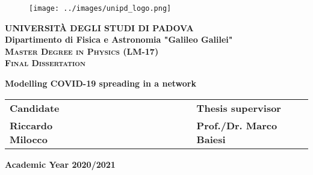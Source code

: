 \documentclass[a4paper,11pt,twoside]{report} %
\makeatletter
\renewcommand\tableofcontents{%
    \section*{\Huge{\contentsname}}%
    \@starttoc{toc}%
}
\makeatother
\begin{document}

\begin{titlepage}
\vspace{5mm}
\begin{figure}[hbtp]
\centering
\texttt{[image: ../images/unipd\_logo.png]}
\end{figure}
\vspace{5mm}
\begin{center}
{{\huge{\textsc{\bf UNIVERSIT\`A DEGLI STUDI DI PADOVA}}}\\}
\vspace{5mm}
{\Large{\bf Dipartimento di Fisica e Astronomia "Galileo Galilei"}} \\
\vspace{5mm}
{\Large{\textsc{\bf Master Degree in Physics (LM-17)}}}\\
\vspace{20mm}
{\Large{\textsc{\bf Final Dissertation}}}\\
\vspace{30mm}
\begin{spacing}{3}
{\LARGE \textbf{Modelling COVID-19 spreading in a network}}\\
\end{spacing}
\vspace{8mm}
\end{center}

\vspace{20mm}
\begin{spacing}{2}
\begin{tabular}{ l  c  c c c  cc c c c c  l }
{\Large{\bf Candidate}} &&&&&&&&&&& {\Large{\bf Thesis supervisor}}\\
{\Large{\bf Riccardo Milocco}} &&&&&&&&&&& {\Large{\bf Prof./Dr. Marco Baiesi}}\\
\end{tabular}
\end{spacing}
\vspace{15 mm}

\begin{center}
{\Large{\bf Academic Year 2020/2021}}
\end{center}
\end{titlepage}

\restoregeometry

\clearpage{\pagestyle{empty}\cleardoublepage}

\pagestyle{empty}

\vspace*{\fill}
\tableofcontents
\vspace*{\fill}
\end{document}
